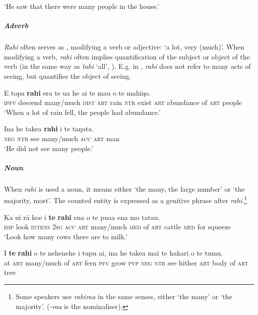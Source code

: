 \glt 
‘He saw that there were many people in the house.’ \textstyleExampleref{[R229.295]} 
\z

\subparagraph{Adverb} \textit{Rahi} often serves as , modifying a verb or adjective: ‘a lot, very (much)’. When modifying a verb, \textit{rahi} often implies quantification of the subject or object of the verb (in the same way as \textit{tahi} ‘all’, ). E.g. in , \textit{rahi} does not refer to many acts of seeing, but quantifies the object of seeing.

\ea\label{ex:4.97}
\gll E topa \textbf{rahi} era te {\ꞌ}ua he ai te mau o te mahiŋo. \\
\textsc{ipfv} descend many/much \textsc{dist} \textsc{art} rain \textsc{ntr} exist \textsc{art} abundance of \textsc{art} people \\

\glt 
‘When a lot of rain fell, the people had abundance.’ \textstyleExampleref{[Fel-19.006]}
\z

\ea\label{ex:4.98}
\gll {\ꞌ}Ina he take{\ꞌ}a \textbf{rahi} i te taŋata. \\
\textsc{neg} \textsc{ntr} see many/much \textsc{acc} \textsc{art} man \\

\glt 
‘He did not see many people.’ \textstyleExampleref{[R459.003]} 
\z

\subparagraph{Noun} When \textit{rahi} is used a noun, it means either ‘the many, the large number’ or ‘the majority, most’. The counted entity is expressed as a genitive phrase after \textit{rahi}.\footnote{\label{fn:187}Some speakers use \textit{rahira{\ꞌ}a} in the same senses, either ‘the many’ or ‘the majority’. (\textit{-ra{\ꞌ}a} is the  nominaliser).}

\ea\label{ex:4.99}
\gll Ka u{\ꞌ}i rā koe i \textbf{te} \textbf{rahi} ena o te pua{\ꞌ}a ena mo tatau. \\
\textsc{imp} look \textsc{intens} \textsc{2sg} \textsc{acc} \textsc{art} many/much \textsc{med} of \textsc{art} cattle \textsc{med} for squeeze \\

\glt 
‘Look how many cows there are to milk.’ \textstyleExampleref{[R245.186]} 
\z

\ea\label{ex:4.100}
\gll {\ꞌ}I \textbf{te} \textbf{rahi} o te nehenehe i tupu ai, {\ꞌ}ina he take{\ꞌ}a mai te hakari o te tumu.\\
at \textsc{art} many/much of \textsc{art} fern \textsc{pfv} grow \textsc{pvp} \textsc{neg} \textsc{ntr} see hither \textsc{art} body of \textsc{art} tree\\

